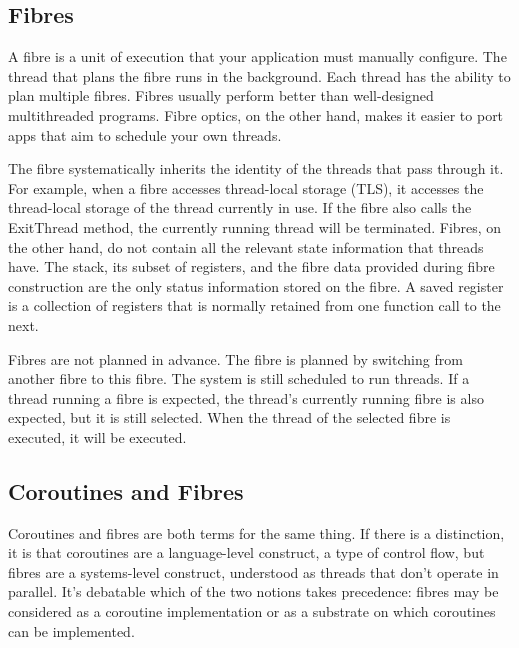 \subsection{Fibres}
A fibre is a unit of execution that your application must manually configure. The thread that plans the fibre runs in the background. Each thread has the ability to plan multiple fibres. Fibres usually perform better than well-designed multithreaded programs. Fibre optics, on the other hand, makes it easier to port apps that aim to schedule your own threads.

The fibre systematically inherits the identity of the threads that pass through it. For example, when a fibre accesses thread-local storage (TLS), it accesses the thread-local storage of the thread currently in use. If the fibre also calls the ExitThread method, the currently running thread will be terminated. Fibres, on the other hand, do not contain all the relevant state information that threads have. The stack, its subset of registers, and the fibre data provided during fibre construction are the only status information stored on the fibre. A saved register is a collection of registers that is normally retained from one function call to the next.

Fibres are not planned in advance. The fibre is planned by switching from another fibre to this fibre. The system is still scheduled to run threads. If a thread running a fibre is expected, the thread's currently running fibre is also expected, but it is still selected. When the thread of the selected fibre is executed, it will be executed.

\subsection{Coroutines and Fibres}
Coroutines and fibres are both terms for the same thing. If there is a distinction, it is that coroutines are a language-level construct, a type of control flow, but fibres are a systems-level construct, understood as threads that don't operate in parallel. It's debatable which of the two notions takes precedence: fibres may be considered as a coroutine implementation or as a substrate on which coroutines can be implemented.


